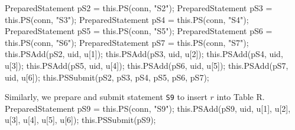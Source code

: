 \documentclass{article}
\def\nwendcode{\endtrivlist \endgroup}      %
\let\nwdocspar=\par
\theoremstyle{definition}                   %
\begin{document}
PreparedStatement pS2 = this.PS(conn, "S2");
PreparedStatement pS3 = this.PS(conn, "S3");
PreparedStatement pS4 = this.PS(conn, "S4");
PreparedStatement pS5 = this.PS(conn, "S5");
PreparedStatement pS6 = this.PS(conn, "S6");
PreparedStatement pS7 = this.PS(conn, "S7");
this.PSAdd(pS2, uid, u[1]);
this.PSAdd(pS3, uid, u[2]);
this.PSAdd(pS4, uid, u[3]);
this.PSAdd(pS5, uid, u[4]);
this.PSAdd(pS6, uid, u[5]);
this.PSAdd(pS7, uid, u[6]);
this.PSSubmit(pS2, pS3, pS4, pS5, pS6, pS7);
\nwendcode{}\nwdocspar
{\small Similarly, we prepare and submit statement {\tt{}\protect{}S9} to insert $r$ into
Table R.}
\nwenddocs{}\endmoddef{}
PreparedStatement pS9 = this.PS(conn, "S9");
this.PSAdd(pS9, uid, u[1], u[2], u[3], u[4], u[5], u[6]);
this.PSSubmit(pS9);
\nwendcode{}\nwdocspar
\end{document}
